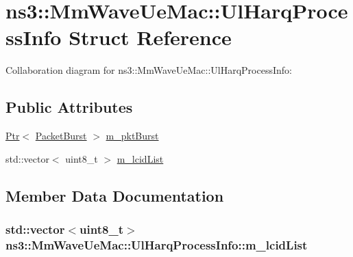 \hypertarget{structns3_1_1MmWaveUeMac_1_1UlHarqProcessInfo}{}\section{ns3\+:\+:Mm\+Wave\+Ue\+Mac\+:\+:Ul\+Harq\+Process\+Info Struct Reference}
\label{structns3_1_1MmWaveUeMac_1_1UlHarqProcessInfo}


Collaboration diagram for ns3\+:\+:Mm\+Wave\+Ue\+Mac\+:\+:Ul\+Harq\+Process\+Info\+:
\subsection*{Public Attributes}
\begin{DoxyCompactItemize}
\item 
\hyperlink{classns3_1_1Ptr}{Ptr}$<$ \hyperlink{classns3_1_1PacketBurst}{Packet\+Burst} $>$ \hyperlink{structns3_1_1MmWaveUeMac_1_1UlHarqProcessInfo_ad1c68b88497f8fa92f173f28d62487c2}{m\+\_\+pkt\+Burst}
\item 
std\+::vector$<$ uint8\+\_\+t $>$ \hyperlink{structns3_1_1MmWaveUeMac_1_1UlHarqProcessInfo_a9dac20e549f2b3d85f66fa0d1cae191d}{m\+\_\+lcid\+List}
\end{DoxyCompactItemize}


\subsection{Member Data Documentation}
\subsubsection[{\texorpdfstring{m\+\_\+lcid\+List}{m_lcidList}}]{\setlength{\rightskip}{0pt plus 5cm}std\+::vector$<$uint8\+\_\+t$>$ ns3\+::\+Mm\+Wave\+Ue\+Mac\+::\+Ul\+Harq\+Process\+Info\+::m\+\_\+lcid\+List}\hypertarget{structns3_1_1MmWaveUeMac_1_1UlHarqProcessInfo_a9dac20e549f2b3d85f66fa0d1cae191d}{}\label{structns3_1_1MmWaveUeMac_1_1UlHarqProcessInfo_a9dac20e549f2b3d85f66fa0d1cae191d}
